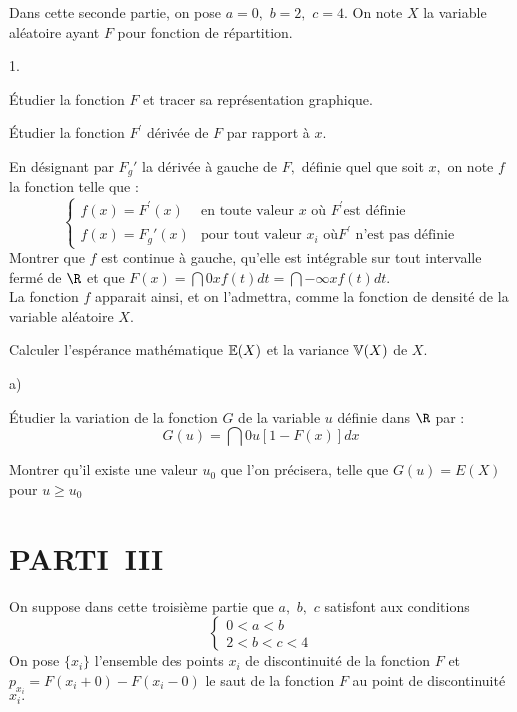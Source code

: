 \documentclass[11pt]{article}%
\begin{document}
Dans cette seconde partie, on pose $a = 0,$ $b = 2,$ $c = 4.$ On note
$X$ la
variable aléatoire ayant $F$ pour fonction de répartition.

\begin{noliste}{1.}
 \setlength{\itemsep}{4mm}
\item Étudier la fonction $F$ et tracer sa représentation graphique.

\item Étudier la fonction $F^{\prime }$ dérivée de $F$ par rapport à
$x.$

\item En désignant par $F_{g}{\prime }$ la dérivée à gauche de $F,$
définie
quel que soit $x,$ on note $f$ la fonction telle que :
\[
\left\{ 
\begin{array}{ll}
f(x) = F^{\prime }(x) & \text{en toute valeur }x\text{ où }F^{\prime
}\text{
est définie} \\
f(x) = F_{g}{\prime }(x) & \text{pour tout valeur }x_{i}\text{ où
}F^{\prime }\text{ n'est pas définie}
\end{array}
\right. 
\]
Montrer que $f$ est continue à gauche, qu'elle est intégrable sur tout
intervalle fermé de $\R$ et que $F(x) = \dint{0}{x}f(t)dt =
\dint{-\infty }{x}f(t)dt.$\\
La fonction $f$ apparait ainsi, et on l'admettra, comme la fonction de
densité de la variable aléatoire $X.$

\item Calculer l'espérance mathématique $\mathbb{E}(X)$ et la variance $\mathbb{V}(X)$
de $X.$

\item 

\begin{noliste}{a)}
 \setlength{\itemsep}{2mm}
\item Étudier la variation de la fonction $G$ de la variable $u$
définie
dans $\R$ par :
\[
G(u) = \dint{0}{u}[1-F(x)]dx
\]

\item Montrer qu'il existe une valeur $u_{0}$ que l'on précisera, telle
que $G(u) = E(X)$ pour $u\geq u_{0}$
\end{noliste}
\end{noliste}

\section*{PARTI\E\ III}

On suppose dans cette troisième partie que $a,$ $b,$ $c$ satisfont aux
conditions 
\[
\left\{ 
\begin{array}{l}
0<a<b \\
2<b<c<4
\end{array}
\right. 
\]
On pose $\{x_{i}\}$ l'ensemble des points $x_{i}$ de discontinuité de
la
fonction $F$ et $p_{x_{i}} = F(x_{i} + 0)-F(x_{i}-0)$ le saut de la
fonction $F$
au point de discontinuité $x_{i}.$
\end{document}
